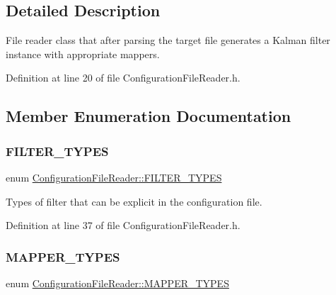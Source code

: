 \subsection{Detailed Description}
File reader class that after parsing the target file generates a Kalman filter instance with appropriate mappers. 

Definition at line 20 of file Configuration\+File\+Reader.\+h.



\subsection{Member Enumeration Documentation}
\mbox{\label{classConfigurationFileReader_a38105d1480e7e412757a48b9f5d1850a}} 
\subsubsection{\texorpdfstring{F\+I\+L\+T\+E\+R\+\_\+\+T\+Y\+P\+ES}{FILTER\_TYPES}}
{\footnotesize\ttfamily enum \mbox{\hyperlink{classConfigurationFileReader_a38105d1480e7e412757a48b9f5d1850a}{Configuration\+File\+Reader\+::\+F\+I\+L\+T\+E\+R\+\_\+\+T\+Y\+P\+ES}}}

Types of filter that can be explicit in the configuration file. 

Definition at line 37 of file Configuration\+File\+Reader.\+h.

\mbox{\label{classConfigurationFileReader_adfafe1ca108e6cdb42c3cda28f76628d}} 
\subsubsection{\texorpdfstring{M\+A\+P\+P\+E\+R\+\_\+\+T\+Y\+P\+ES}{MAPPER\_TYPES}}
{\footnotesize\ttfamily enum \mbox{\hyperlink{classConfigurationFileReader_adfafe1ca108e6cdb42c3cda28f76628d}{Configuration\+File\+Reader\+::\+M\+A\+P\+P\+E\+R\+\_\+\+T\+Y\+P\+ES}}}


